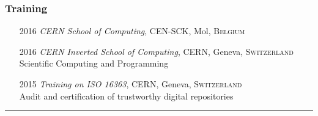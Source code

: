 \documentclass[12pt,a4paper]{article}
\newcommand{\colorrule}[1]
{
  {\color{#1}\hrule height 2pt}
  \vspace{1.0em}
}
\begin{document}
\subsubsection*{Training}
\begin{itemize}
	\item[2016] \emph{CERN School of Computing}, {CEN-SCK}, Mol,
		\textsc{Belgium}
	\item[2016] \emph{CERN Inverted School of Computing},  {CERN}, Geneva,
		\textsc{Switzerland}\\
	{\small Scientific Computing and Programming}
	\item[2015] \emph{Training on ISO 16363}, {CERN}, Geneva, \textsc{Switzerland}\\
	{\small Audit and certification of trustworthy digital repositories}
\end{itemize}

\colorrule{NavyBlue}
\end{document}
